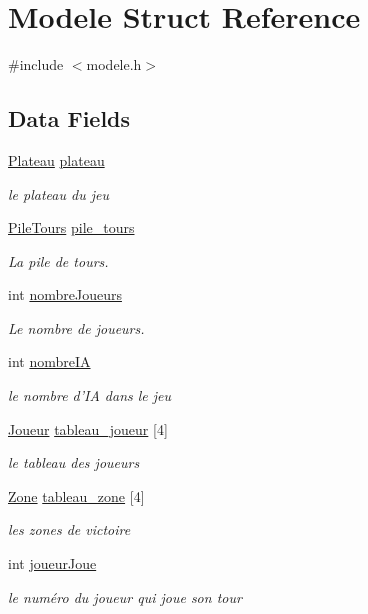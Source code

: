 \hypertarget{struct_modele}{\section{Modele Struct Reference}
\label{struct_modele}
}


{\ttfamily \#include $<$modele.\-h$>$}

\subsection*{Data Fields}
\begin{DoxyCompactItemize}
\item 
\hyperlink{struct_plateau}{Plateau} \hyperlink{struct_modele_a274d642eb6fb8198fe001160fd7d3f8a}{plateau}
\begin{DoxyCompactList}\small\item\em le plateau du jeu \end{DoxyCompactList}\item 
\hyperlink{struct_pile_tours}{Pile\-Tours} \hyperlink{struct_modele_a2c13602dcbaf121a0fe73a479d84fdf7}{pile\-\_\-tours}
\begin{DoxyCompactList}\small\item\em La pile de tours. \end{DoxyCompactList}\item 
int \hyperlink{struct_modele_a8ec31041fec4c54afd404998e104d0f9}{nombre\-Joueurs}
\begin{DoxyCompactList}\small\item\em Le nombre de joueurs. \end{DoxyCompactList}\item 
int \hyperlink{struct_modele_a9bd6d0553f9653fd91976d0931e5de01}{nombre\-I\-A}
\begin{DoxyCompactList}\small\item\em le nombre d'I\-A dans le jeu \end{DoxyCompactList}\item 
\hyperlink{struct_joueur}{Joueur} \hyperlink{struct_modele_a17b14d4b8715460060a9e5e252060783}{tableau\-\_\-joueur} \mbox{[}4\mbox{]}
\begin{DoxyCompactList}\small\item\em le tableau des joueurs \end{DoxyCompactList}\item 
\hyperlink{struct_zone}{Zone} \hyperlink{struct_modele_ab3f20b5c19f7f0df05d0838b737eb907}{tableau\-\_\-zone} \mbox{[}4\mbox{]}
\begin{DoxyCompactList}\small\item\em les zones de victoire \end{DoxyCompactList}\item 
int \hyperlink{struct_modele_a99d0d68865bfab3c617eec56d5c07f40}{joueur\-Joue}
\begin{DoxyCompactList}\small\item\em le numéro du joueur qui joue son tour \end{DoxyCompactList}\end{DoxyCompactItemize}


